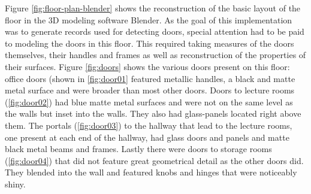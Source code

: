 Figure \ref{fig:floor-plan-blender} shows the reconstruction of the basic layout of the floor in the 3D modeling software Blender. As the goal of this implementation was to generate records used for detecting doors, special attention had to be paid to modeling the doors in this floor. This required taking measures of the doors themselves, their handles and frames as well as reconstruction of the properties of their surfaces. Figure \ref{fig:doors} shows the various doors present on this floor: office doors (shown in \ref{fig:door01} featured metallic handles, a black and matte metal surface and were broader than most other doors. Doors to lecture rooms (\ref{fig:door02}) had blue matte metal surfaces and were not on the same level as the walls but inset into the walls. They also had glass-panels located right above them. The portals (\ref{fig:door03}) to the hallway that lead to the lecture rooms, one present at each end of the hallway, had glass doors and panels and matte black metal beams and frames. Lastly there were doors to storage rooms (\ref{fig:door04}) that did not feature great geometrical detail as the other doors did. They blended into the wall and featured knobs and hinges that were noticeably shiny.

